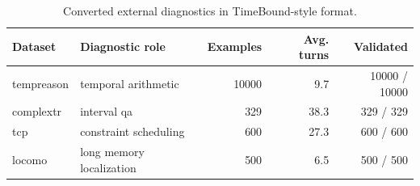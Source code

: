 \begin{table}[t]
\centering
\small
\begin{tabular}{llrrr}
\toprule
Dataset & Diagnostic role & Examples & Avg. turns & Validated \\
\midrule
tempreason & temporal arithmetic & 10000 & 9.7 & 10000 / 10000 \\
complextr & interval qa & 329 & 38.3 & 329 / 329 \\
tcp & constraint scheduling & 600 & 27.3 & 600 / 600 \\
locomo & long memory localization & 500 & 6.5 & 500 / 500 \\
\bottomrule
\end{tabular}
\caption{Converted external diagnostics in TimeBound-style format.}
\label{tab:external_converted_stats}
\end{table}
